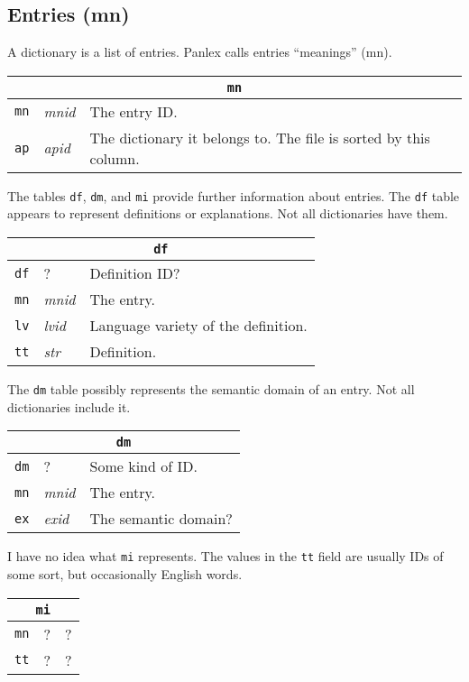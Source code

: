 \subsection{Entries (mn)}

A dictionary is a list of entries.  Panlex calls entries ``meanings'' (mn).
\begin{trivlist}\item
\begin{tabular}{|llp{3.5in}|}
\hline
\multicolumn{3}{|c|}{\tt mn}\\
\hline
{\tt mn} & {\it mnid} & The entry ID.\\
{\tt ap} & {\it apid} & The dictionary it belongs to.  The file is
    sorted by this column.\\
\hline
\end{tabular}
\end{trivlist}
The tables {\tt df}, {\tt dm}, and {\tt mi} provide further
information about entries.
The {\tt df} table appears to represent definitions or explanations.
Not all dictionaries have them.
\begin{trivlist}\item
\begin{tabular}{|llp{3.5in}|}
\hline
\multicolumn{3}{|c|}{\tt df}\\
\hline
{\tt df} & ? & Definition ID?\\
{\tt mn} & {\it mnid} & The entry.\\
{\tt lv} & {\it lvid} & Language variety of the definition.\\
{\tt tt} & {\it str} & Definition.\\
\hline
\end{tabular}
\end{trivlist}
The {\tt dm} table possibly represents the semantic domain of an
entry.  Not all dictionaries include it.
\begin{trivlist}\item
\begin{tabular}{|llp{3.5in}|}
\hline
\multicolumn{3}{|c|}{\tt dm}\\
\hline
{\tt dm} & ? & Some kind of ID.\\
{\tt mn} & {\it mnid} & The entry.\\
{\tt ex} & {\it exid} & The semantic domain?\\
\hline
\end{tabular}
\end{trivlist}
I have no idea what {\tt mi} represents.  The values in the {\tt tt}
field are usually IDs of some sort, but occasionally English words.
\begin{trivlist}\item
\begin{tabular}{|llp{3.5in}|}
\hline
\multicolumn{3}{|c|}{\tt mi}\\
\hline
{\tt mn} & ? & ?\\
{\tt tt} & ? & ?\\
\hline
\end{tabular}
\end{trivlist}


